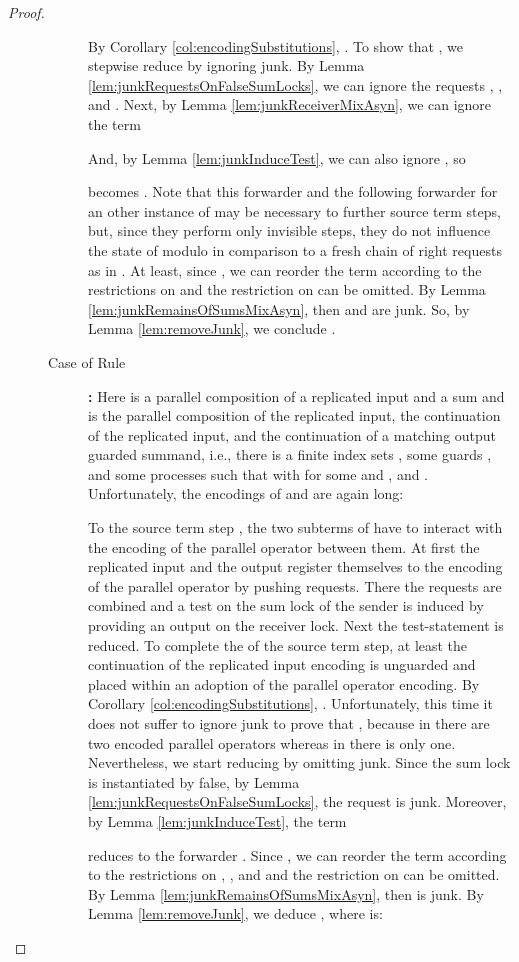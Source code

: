 \documentclass[]{llncs}
\begin{document}
\begin{proof}
\begin{description}
\begin{description}
					
					By Corollary \ref{col:encodingSubstitutions}, . To show that , we stepwise reduce  by ignoring junk. By Lemma \ref{lem:junkRequestsOnFalseSumLocks}, we can ignore the requests , , and . Next, by Lemma \ref{lem:junkReceiverMixAsyn}, we can ignore the term
					
					And, by Lemma \ref{lem:junkInduceTest}, we can also ignore , so
					
					becomes . Note that this forwarder and the following forwarder  for an other instance of  may be necessary to \simulate further source term steps, but, since they perform only invisible steps, they do not influence the state of  modulo  in comparison to a fresh chain of right requests as in . At least, since , we can reorder the term according to the restrictions on  and the restriction on  can be omitted. By Lemma \ref{lem:junkRemainsOfSumsMixAsyn}, then  and  are junk. So, by Lemma \ref{lem:removeJunk}, we conclude .
				\item[Case of Rule] \textbf{:} Here  is a parallel composition of a replicated input and a sum and  is the parallel composition of the replicated input, the continuation of the replicated input, and the continuation of a matching output guarded summand, i.e., there is a finite index sets , some guards , and some processes  such that  with  for some  and , and . Unfortunately, the encodings of  and  are again long:
					
					To \simulate the source term step , the two subterms of  have to interact with the encoding of the parallel operator between them. At first the replicated input and the output register themselves to the encoding of the parallel operator by pushing requests. There the requests are combined and a test on the sum lock of the sender is induced by providing an output on the receiver lock. Next the test-statement is reduced. To complete the \simulation of the source term step, at least the continuation of the replicated input encoding is unguarded and placed within an adoption of the parallel operator encoding.
					{\allowdisplaybreaks
					}
					By Corollary \ref{col:encodingSubstitutions}, . Unfortunately, this time it does not suffer to ignore junk to prove that , because in  there are two encoded parallel operators whereas in  there is only one. Nevertheless, we start reducing  by omitting junk. Since the sum lock  is instantiated by false, by Lemma \ref{lem:junkRequestsOnFalseSumLocks}, the request  is junk. Moreover, by Lemma \ref{lem:junkInduceTest}, the term
					
					reduces to the forwarder . Since , we can reorder the term according to the restrictions on , , and  and the restriction on  can be omitted. By Lemma \ref{lem:junkRemainsOfSumsMixAsyn}, then  is junk. By Lemma \ref{lem:removeJunk}, we deduce , where  is:
					

\end{description}
\end{description}
\end{proof}
\end{document}
